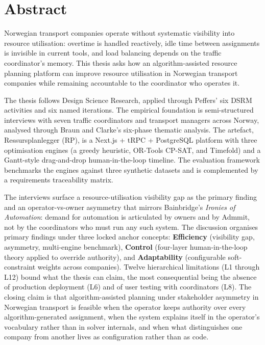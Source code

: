 \chapter*{Abstract}

Norwegian transport companies operate without systematic visibility into resource utilisation: overtime is handled reactively, idle time between assignments is invisible in current tools, and load balancing depends on the traffic coordinator's memory. This thesis asks how an algorithm-assisted resource planning platform can improve resource utilisation in Norwegian transport companies while remaining accountable to the coordinator who operates it.

The thesis follows Design Science Research, applied through Peffers' six DSRM activities and six named iterations. The empirical foundation is semi-structured interviews with seven traffic coordinators and transport managers across Norway, analysed through Braun and Clarke's six-phase thematic analysis. The artefact, Ressursplanlegger (RP), is a Next.js + tRPC + PostgreSQL platform with three optimisation engines (a greedy heuristic, OR-Tools CP-SAT, and Timefold) and a Gantt-style drag-and-drop human-in-the-loop timeline. The evaluation framework benchmarks the engines against three synthetic datasets and is complemented by a requirements traceability matrix.

The interviews surface a resource-utilisation visibility gap as the primary finding and an operator-vs-owner asymmetry that mirrors Bainbridge's \emph{Ironies of Automation}: demand for automation is articulated by owners and by Admmit, not by the coordinators who must run any such system. The discussion organises primary findings under three locked anchor concepts: \textbf{Efficiency} (visibility gap, asymmetry, multi-engine benchmark), \textbf{Control} (four-layer human-in-the-loop theory applied to override authority), and \textbf{Adaptability} (configurable soft-constraint weights across companies). Twelve hierarchical limitations (L1 through L12) bound what the thesis can claim, the most consequential being the absence of production deployment (L6) and of user testing with coordinators (L8). The closing claim is that algorithm-assisted planning under stakeholder asymmetry in Norwegian transport is feasible when the operator keeps authority over every algorithm-generated assignment, when the system explains itself in the operator's vocabulary rather than in solver internals, and when what distinguishes one company from another lives as configuration rather than as code.
